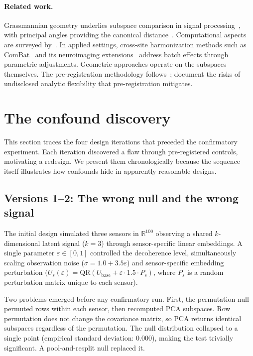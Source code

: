 \documentclass[11pt]{article}
\newcommand{\eps}{\varepsilon}
\begin{document}
\paragraph{Related work.}
Grassmannian geometry underlies subspace comparison in signal
processing~\citep{edelman1998geometry}, with principal angles
providing the canonical distance~\citep{golub1973numerical,
ye2016schubert}.  Computational aspects are surveyed
by~\citet{bendokat2024grassmann}.  In applied settings,
cross-site harmonization methods such as
ComBat~\citep{johnson2007adjusting} and its neuroimaging
extensions~\citep{fortin2018harmonization} address batch effects
through parametric adjustments.  Geometric approaches operate
on the subspaces themselves.  The pre-registration
methodology follows~\citet{nosek2018preregistration};
\citet{simmons2011false} document the risks of undisclosed
analytic flexibility that pre-registration mitigates.

\section{The confound discovery}
\label{sec:confound}

This section traces the four design iterations that preceded the
confirmatory experiment.  Each iteration discovered a flaw through
pre-registered controls, motivating a redesign.  We present them
chronologically because the sequence itself illustrates how
confounds hide in apparently reasonable designs.

\subsection{Versions 1--2: The wrong null and the wrong signal}
\label{sec:v1v2}

The initial design simulated three sensors in $\mathbb{R}^{100}$
observing a shared $k$-dimensional latent signal ($k = 3$) through
sensor-specific linear embeddings.  A single parameter $\eps \in
[0, 1]$ controlled the decoherence level, simultaneously
scaling observation noise ($\sigma = 1.0 + 3.5\eps$) and
sensor-specific embedding perturbation ($U_s(\eps) =
\mathrm{QR}(U_\mathrm{base} + \eps \cdot 1.5 \cdot P_s)$, where
$P_s$ is a random perturbation matrix unique to each sensor).

Two problems emerged before any confirmatory run.  First, the
permutation null permuted rows within each sensor, then recomputed
PCA subspaces.  Row permutation does not change the covariance
matrix, so PCA returns identical subspaces regardless of the
permutation.  The null distribution collapsed to a single point
(empirical standard deviation: $0.000$), making the test trivially
significant.  A pool-and-resplit null replaced it.
\end{document}
